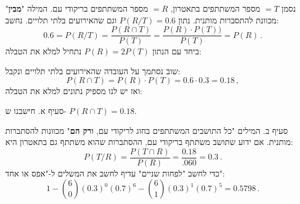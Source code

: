 \documentclass[12pt,a4paper]{article}
\newcommand{\bover}[1]{\bm{\overline{#1}}}
\begin{document}
נסמן
$=T$
מספר המשתתפים בתאטרון,
$=R$
מספר המשתתפים בריקודי עם. המילה 
"\textbf{מבין}"
מכוונת להתסברות מותנית. נתון
$P(R/T)=0.6$
וגם שהאירועים בלתי תלויים. נחשב:
\[
0.6=P(R/T)=\frac{P(R\cap T)}{P(T)}=\frac{P(R)\cdot P(T))}{P(T)}=P(R)\,.
\]
ביחד עם הנתון
$P(R)=2P(T)$
נתחיל למלא את הטבלה:
\begin{center}
\end{center}
שוב נסתמך על העובדה שהאירועים בלתי תלויים ונקבל:
\[
P(R\cap T)=P(R)\cdot P(T)=0.6\cdot 0.3=0.18\,,
\]
ואז יש לנו מספיק נתונים למלא את הטבלה:
\begin{center}
\end{center}
סעיף א. חישבנו ש-%
$P(R\cap T)=0.18$.

סעיף ב. המילים "כל התושבים המשתתפים בחוג לריקודי עם,
\textbf{ורק הם}"
מכוונות להסתברות מותנית. אם ידוע שתושב משתתף בריקודי עם, ההסתברות שהוא משתתף גם בתאטרון היא:
\[
P(T/R) = \frac{P(T\cap R)}{P(R)}= \frac{0.18}{.060} = 0.3\,.
\]
כדי לחשב "לפחות שניים" עדיף לחשב את המשלים ל-"אפס או אחד":
\[
1-{6\choose 0}(0.3)^0(0.7)^6 -{6\choose 1}(0.3)^1(0.7)^5=0.5798\,.
\]

\newpage

\textbf{}
\end{document}
